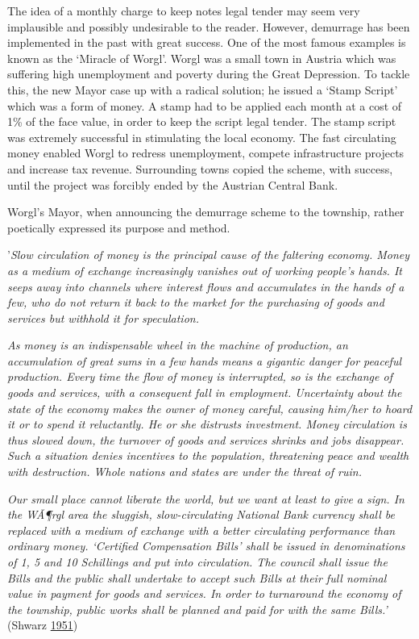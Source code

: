 \documentclass[]{tufte-handout}
\begin{document}
The idea of a monthly charge to keep notes legal tender may seem very
implausible and possibly undesirable to the reader. However, demurrage
has been implemented in the past with great success. One of the most
famous examples is known as the `Miracle of Worgl'. Worgl was a small
town in Austria which was suffering high unemployment and poverty during
the Great Depression. To tackle this, the new Mayor case up with a
radical solution; he issued a `Stamp Script' which was a form of money.
A stamp had to be applied each month at a cost of 1\% of the face value,
in order to keep the script legal tender. The stamp script was extremely
successful in stimulating the local economy. The fast circulating money
enabled Worgl to redress unemployment, compete infrastructure projects
and increase tax revenue. Surrounding towns copied the scheme, with
success, until the project was forcibly ended by the Austrian Central
Bank.

Worgl's Mayor, when announcing the demurrage scheme to the township,
rather poetically expressed its purpose and method.

'\emph{Slow circulation of money is the principal cause of the faltering
economy. Money as a medium of exchange increasingly vanishes out of
working people's hands. It seeps away into channels where interest flows
and accumulates in the hands of a few, who do not return it back to the
market for the purchasing of goods and services but withhold it for
speculation.}

\emph{As money is an indispensable wheel in the machine of production,
an accumulation of great sums in a few hands means a gigantic danger for
peaceful production. Every time the flow of money is interrupted, so is
the exchange of goods and services, with a consequent fall in
employment. Uncertainty about the state of the economy makes the owner
of money careful, causing him/her to hoard it or to spend it
reluctantly. He or she distrusts investment. Money circulation is thus
slowed down, the turnover of goods and services shrinks and jobs
disappear. Such a situation denies incentives to the population,
threatening peace and wealth with destruction. Whole nations and states
are under the threat of ruin.}

\emph{Our small place cannot liberate the world, but we want at least to
give a sign. In the WÃ¶rgl area the sluggish, slow-circulating National
Bank currency shall be replaced with a medium of exchange with a better
circulating performance than ordinary money. `Certified Compensation
Bills' shall be issued in denominations of 1, 5 and 10 Schillings and
put into circulation. The council shall issue the Bills and the public
shall undertake to accept such Bills at their full nominal value in
payment for goods and services. In order to turnaround the economy of
the township, public works shall be planned and paid for with the same
Bills.'} (Shwarz \protect\hyperlink{ref-Shwarz1951}{1951})
\end{document}
